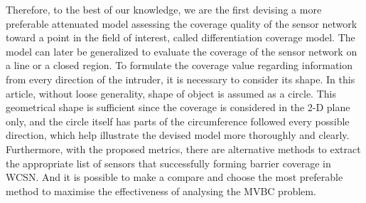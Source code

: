 \documentclass[3p]{elsarticle}
\begin{document}
%
Therefore, to the best of our knowledge, we are the first devising a more preferable attenuated model assessing the coverage quality of the sensor network toward a point in the field of interest, called differentiation coverage model. The model can later be generalized to evaluate the coverage of the sensor network on a line or a closed region. To formulate the coverage value regarding information from every direction of the intruder, it is necessary to consider its shape. In this article, without loose generality, shape of object is assumed as a circle. This geometrical shape is sufficient since the coverage is considered in the 2-D plane only, and the circle itself has parts of the circumference followed every possible direction, which help illustrate the devised model more thoroughly and clearly. Furthermore, with the proposed metrics, there are alternative methods to extract the appropriate list of sensors that successfully forming barrier coverage in WCSN. And it is possible to make a compare and choose the most preferable method to maximise the effectiveness of analysing the MVBC problem.\par
\end{document}
